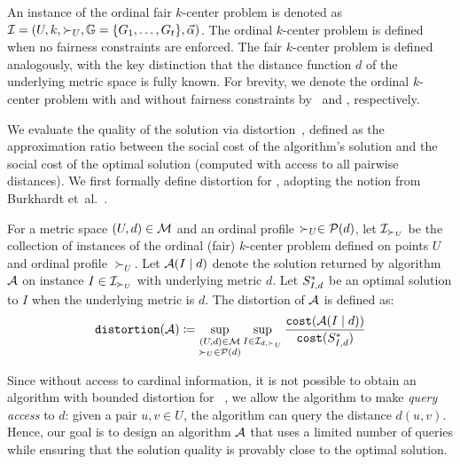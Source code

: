 An instance of the ordinal fair $k$-center problem is denoted as $\mathcal{I} = (U,k, \succ_U, \mathbb{G}=\{G_1,\dots,G_t\},\vec{\alpha})$.
The ordinal $k$-center problem is defined when no fairness constraints are enforced.
The fair $k$-center problem is defined analogously, with the key distinction that the distance function $d$ of the underlying metric space is fully known.  
For brevity, we denote the ordinal $k$-center problem with and without fairness constraints by \ordfairkcen\ and \ordkcen, respectively.

We evaluate the quality of the solution via distortion~\cite{procaccia2006distortion}, defined as the approximation ratio between the social cost of the algorithm's solution 
and the social cost of the optimal solution (computed with access to all pairwise distances).
We first formally define distortion for \ordfairkcen, adopting the notion from Burkhardt et~al.~\cite{burkhardt2024low}.




\begin{definition}
    For a metric space $(U,d) \in \mathcal{M}$ and an ordinal profile $\succ_U \in \mathcal{P}(d)$, let $\mathcal{I}_{\succ_U}$ be the collection of instances of the ordinal (fair) $k$-center problem defined on points $U$ and ordinal profile $\succ_U$. 
    Let $\mathcal{A}(I \mid d)$ denote the solution returned by algorithm $\mathcal{A}$ on instance $I \in \mathcal{I}_{\succ_U}$ with underlying metric $d$. 
    Let $S^*_{I, d}$ be an optimal solution to $I$ when the underlying metric is $d$.
    The distortion of $\mathcal{A}$ is defined as:
    \[
    \texttt{dis\-tor\-tion}(\mathcal{A})\coloneqq \sup_{\substack{(U,d) \in \mathcal{M} \\ \succ_U \in \mathcal{P}(d)}} \sup_{I \in \mathcal{I}_{d,\succ_U}}  \frac{\texttt{cost}(\mathcal{A}(I \mid d))}{\texttt{cost}(S^*_{I,d})}
    \]
\end{definition}


Since without access to cardinal information, it is not possible to obtain an algorithm with bounded distortion for \ordkcen~\cite{burkhardt2024low}, we allow the algorithm to make \emph{query access} to $d$: given a pair $u,v\in U$, the algorithm can query the distance $d(u,v)$. 
Hence, our goal is to design an algorithm $\mathcal{A}$ that uses a limited number of queries while ensuring that the solution quality is provably close to the optimal solution. 


